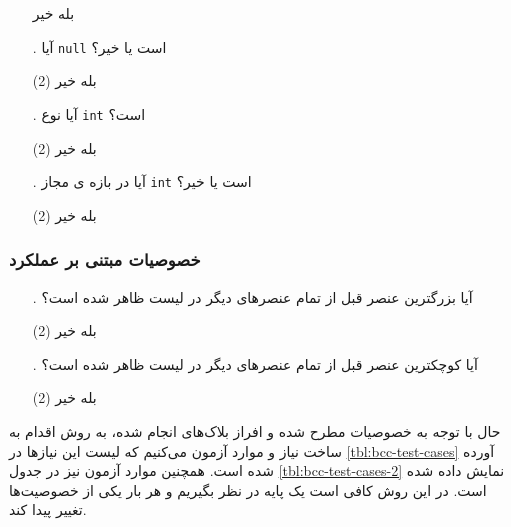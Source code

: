 \documentclass[twoside]{article}
\newenvironment{answer}{}{\medskip}
\begin{document}
\begin{answer}
\begin{enumerate}
\begin{tasks}
		\task[\lr{1}. ] بله
		\task[\lr{2}. ] خیر
	\end{tasks}
	\item[\lr{\textbf{G}}.]
آیا  \texttt{null} است یا خیر؟
	\begin{tasks}(2)
		\task[\lr{1}. ] بله
		\task[\lr{2}. ] خیر
	\end{tasks}
	\item[\lr{\textbf{H}}.]
آیا  نوع \texttt{int} است؟
	\begin{tasks}(2)
		\task[\lr{1}. ] بله
		\task[\lr{2}. ] خیر
	\end{tasks}
	\item[\lr{\textbf{I}}.]
آیا  در بازه ی مجاز \texttt{int} است یا خیر؟
	\begin{tasks}(2)
		\task[\lr{1}. ] بله
		\task[\lr{2}. ] خیر
	\end{tasks}
\end{enumerate}
\subsubsection*{خصوصیات مبتنی بر عملکرد}
\begin{enumerate}
	\item[\lr{\textbf{J}}.]
آیا بزرگترین عنصر قبل از تمام عنصرهای دیگر در لیست ظاهر شده است؟
	\begin{tasks}(2)
		\task[\lr{1}. ] بله
		\task[\lr{2}. ] خیر
	\end{tasks}
	\item[\lr{\textbf{K}}.]
آیا کوچکترین عنصر قبل از تمام عنصرهای دیگر در لیست ظاهر شده است؟
	\begin{tasks}(2)
		\task[\lr{1}. ] بله
		\task[\lr{2}. ] خیر
	\end{tasks}
\end{enumerate}
حال با توجه به خصوصیات مطرح شده و افراز بلاک‌های انجام شده، به روش %
اقدام به ساخت نیاز و موارد آزمون می‌کنیم که لیست این نیازها در \autoref{tbl:bcc-test-cases} آورده شده است. همچنین موارد آزمون نیز در جدول \autoref{tbl:bcc-test-cases-2} نمایش داده شده است. در این روش کافی است یک پایه در نظر بگیریم و هر بار یکی از خصوصیت‌ها تغییر پیدا کند.


\end{answer}
\end{document}
